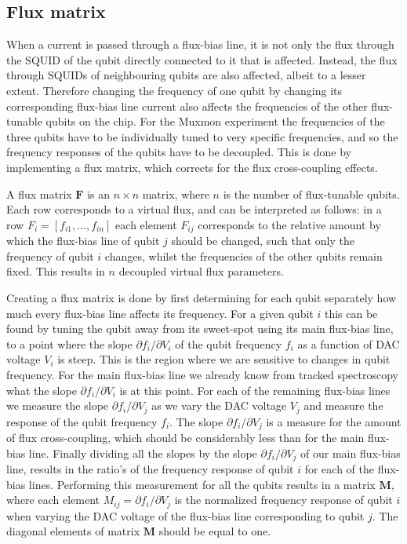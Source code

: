       \subsection{Flux matrix}
        \label{ssec:Flux matrix}
        When a current is passed through a flux-bias line, it is not only the flux through the SQUID of the qubit directly connected to it that is affected. Instead, the flux through SQUIDs of neighbouring qubits are also affected, albeit to a lesser extent. Therefore changing the frequency of one qubit by changing its corresponding flux-bias line current also affects the frequencies of the other flux-tunable qubits on the chip. For the Muxmon experiment the frequencies of the three qubits have to be individually tuned to very specific frequencies, and so the frequency responses of the qubits have to be decoupled. This is done by implementing a flux matrix, which corrects for the flux cross-coupling effects.

        A flux matrix $\boldsymbol{F}$ is an $n \times n$ matrix, where $n$ is the number of flux-tunable qubits. Each row corresponds to a virtual flux, and can be interpreted as follows: in a row $F_i = \left[f_{i1}, \dots, f_{in}\right]$ each element $F_{ij}$ corresponds to the relative amount by which the flux-bias line of qubit $j$ should be changed, such that only the frequency of qubit $i$ changes, whilst the frequencies of the other qubits remain fixed. This results in $n$ decoupled virtual flux parameters.

        Creating a flux matrix is done by first determining for each qubit separately how much every flux-bias line affects its frequency. For a given qubit $i$ this can be found by tuning the qubit away from its sweet-spot using its main flux-bias line, to a point where the slope $\partial f_i/\partial V_i$ of the qubit frequency $f_i$ as a function of DAC voltage $V_i$ is steep. This is the region where we are sensitive to changes in qubit frequency. For the main flux-bias line we already know from tracked spectroscopy what the slope $\partial f_i / \partial V_i$ is at this point. For each of the remaining flux-bias lines we measure the slope $\partial f_i / \partial V_j$ as we vary the DAC voltage $V_j$ and measure the response of the qubit frequency $f_i$. The slope $\partial f_i / \partial V_j$ is a measure for the amount of flux cross-coupling, which should be considerably less than for the main flux-bias line. Finally dividing all the slopes by the slope $\partial f_i / \partial V_j$ of our main flux-bias line, results in the ratio's of the frequency response of qubit $i$ for each of the flux-bias lines. Performing this measurement for all the qubits results in a matrix $\boldsymbol{M}$, where each element $M_{ij}=\partial f_i / \partial V_j$ is the normalized frequency response of qubit $i$ when varying the DAC voltage of the flux-bias line corresponding to qubit $j$. The diagonal elements of matrix $\boldsymbol{M}$ should be equal to one.

